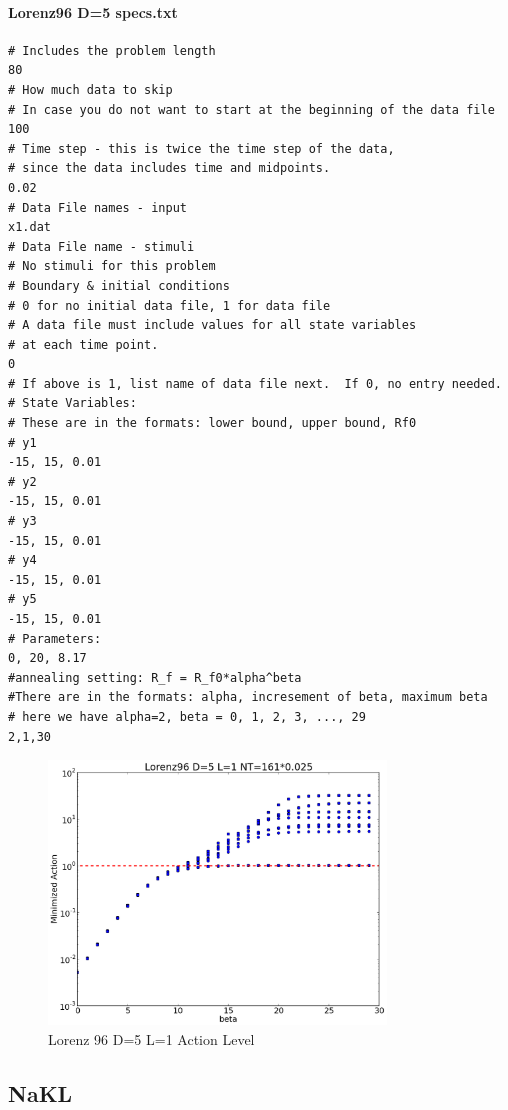 \documentclass[11pt]{article}
\begin{document}
\paragraph{Lorenz96 D=5 specs.txt}
\begin{verbatim}
# Includes the problem length
80
# How much data to skip
# In case you do not want to start at the beginning of the data file
100
# Time step - this is twice the time step of the data,
# since the data includes time and midpoints.
0.02
# Data File names - input
x1.dat
# Data File name - stimuli
# No stimuli for this problem
# Boundary & initial conditions
# 0 for no initial data file, 1 for data file
# A data file must include values for all state variables
# at each time point.
0
# If above is 1, list name of data file next.  If 0, no entry needed.
# State Variables:
# These are in the formats: lower bound, upper bound, Rf0
# y1
-15, 15, 0.01
# y2
-15, 15, 0.01
# y3
-15, 15, 0.01
# y4
-15, 15, 0.01
# y5
-15, 15, 0.01
# Parameters:
0, 20, 8.17
#annealing setting: R_f = R_f0*alpha^beta
#There are in the formats: alpha, incresement of beta, maximum beta
# here we have alpha=2, beta = 0, 1, 2, 3, ..., 29
2,1,30
\end{verbatim}
\begin{figure}[h]
\centering
\includegraphics[width=0.8\textwidth]{figure/lorenz96.png}
\caption{Lorenz 96 D=5 L=1 Action Level}
\label{fig:lorenz96}
\end{figure}
\subsection{NaKL}
\end{document}
